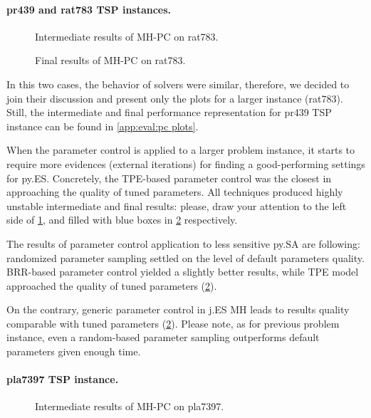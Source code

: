 \paragraph{pr439 and rat783 TSP instances.}
\begin{figure}[t]
	\centering
	\vspace{-20pt}
	
	\caption{Intermediate results of MH-PC on rat783.}
	\vspace{-5pt}
	\label{eval:pict:pc:rat783 intermediate}
\end{figure}
\begin{figure}[b]
	\centering
	\vspace{-20pt}
	
	\caption{Final results of MH-PC on rat783.}
	\vspace{-5pt}
	\label{eval:pict:pc:rat783 final}
\end{figure}

In this two cases, the behavior of solvers were similar, therefore, we decided to join their discussion and present only the plots for a larger instance (rat783). Still, the intermediate and final performance representation for pr439 TSP instance can be found in \cref{app:eval:pc plots}.

When the parameter control is applied to a larger problem instance, it starts to require more evidences (external iterations) for finding a good-performing settings for py.ES. Concretely, the TPE-based parameter control was the closest in approaching the quality of tuned parameters. All techniques produced highly unstable intermediate and final results: please, draw your attention to the left side of \cref{eval:pict:pc:rat783 intermediate}, and filled with blue boxes in \cref{eval:pict:pc:rat783 final} respectively.

The results of parameter control application to less sensitive py.SA are following: randomized parameter sampling settled on the level of default parameters quality. BRR-based parameter control yielded a slightly better results, while TPE model approached the quality of tuned parameters (\cref{eval:pict:pc:rat783 final}).

On the contrary, generic parameter control in j.ES MH leads to results quality comparable  with tuned parameters (\cref{eval:pict:pc:rat783 final}). Please note, as for previous problem instance, even a random-based parameter sampling outperforms default parameters given enough time.

\paragraph{pla7397 TSP instance.}
\begin{figure}[t]
	\centering
	\vspace{-20pt}
	
	\caption{Intermediate results of MH-PC on pla7397.}
	\vspace{-5pt}
	\label{eval:pict:pc:pla7397 intermediate}
\end{figure}

